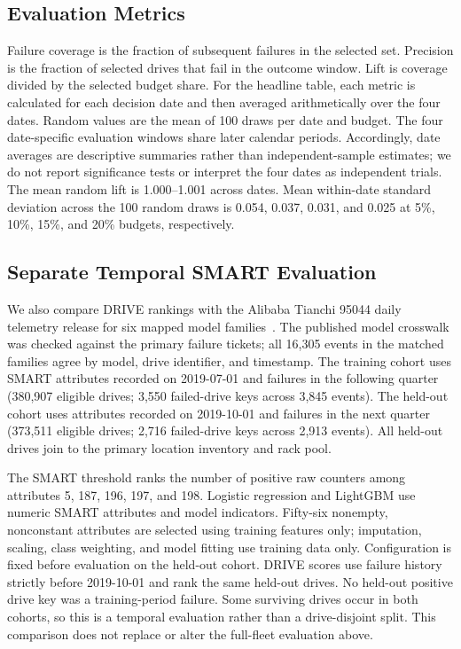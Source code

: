 \documentclass[conference]{IEEEtran}
\begin{document}
\subsection{Evaluation Metrics}
Failure coverage is the fraction of subsequent failures in the selected set. Precision
is the fraction of selected drives that fail in the outcome window. Lift is coverage
divided by the selected budget share. For the headline table, each metric is calculated
for each decision date and then averaged arithmetically over the four dates. Random
values are the mean of 100 draws per date and budget. The four date-specific evaluation
windows share later calendar periods. Accordingly, date averages are descriptive
summaries rather than independent-sample estimates; we do not report significance tests
or interpret the four dates as independent trials.
The mean random lift is 1.000--1.001 across dates. Mean within-date standard deviation
across the 100 random draws is 0.054, 0.037, 0.031, and 0.025 at 5\%, 10\%, 15\%, and
20\% budgets, respectively.

\subsection{Separate Temporal SMART Evaluation}
We also compare DRIVE rankings with the Alibaba Tianchi 95044 daily telemetry release
for six mapped model families~\cite{xu2021}. The published model crosswalk was checked
against the primary failure tickets; all 16,305 events in the matched families agree
by model, drive identifier, and timestamp. The training cohort uses SMART attributes
recorded on 2019-07-01 and failures in the following quarter (380,907 eligible drives;
3,550 failed-drive keys across 3,845 events). The held-out cohort uses attributes
recorded on 2019-10-01 and failures in the next quarter (373,511 eligible drives;
2,716 failed-drive keys across 2,913 events). All held-out drives join to the primary
location inventory and rack pool.

The SMART threshold ranks the number of positive raw counters among attributes 5,
187, 196, 197, and 198. Logistic regression and LightGBM use numeric SMART attributes
and model indicators. Fifty-six nonempty, nonconstant attributes are selected using
training features only; imputation, scaling, class weighting, and model fitting use
training data only. Configuration is fixed before evaluation on the held-out cohort.
DRIVE scores use failure history strictly before 2019-10-01 and rank the same held-out
drives. No held-out positive drive key was a training-period failure. Some surviving
drives occur in both cohorts, so this is a temporal evaluation rather than a
drive-disjoint split. This comparison does not replace or alter the full-fleet
evaluation above.
\end{document}
